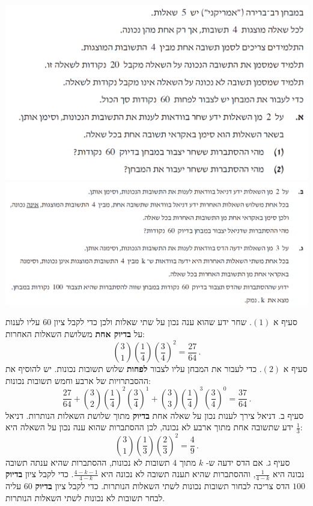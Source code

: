 \documentclass[12pt,a4paper]{article}
\begin{document}
\begin{center}
\includegraphics[width=.85\textwidth]{summer-2018b-3-1}
\includegraphics[width=\textwidth]{summer-2018b-3-2}
\end{center}

סעיף א
$(1)$.
שחר ידע שהוא ענה נכון על שתי שאלות ולכן כדי לקבל ציון
$60$
עליו לענות על 
\textbf{בדיוק אחת}
משלושת השאלות האחרות:
\[
{3 \choose 1}\left(\frac{1}{4}\right)\left(\frac{3}{4}\right)^2=\frac{27}{64}\,.
\]
סעיף א
$(2)$.
כדי לעבור את המבחן עליו לצבור
\textbf{לפחות}
שלוש תשובות נכונות. יש להוסיף את ההסבתרויות של ארבע וחמש תשובות נכונות:
\[
\frac{27}{64}+{3 \choose 2}\left(\frac{1}{4}\right)^2\left(\frac{3}{4}\right)^1+{3 \choose 3}\left(\frac{1}{4}\right)^3\left(\frac{3}{4}\right)^0=\frac{37}{64}\,.
\]
סעיף ב.
דניאל צירך לענות נכון על שאלה אחת 
\textbf{בדיוק}
מתוך שלושת השאלות הנותרות. דניאל ידע שתשובה אחת מתוך ארבע לא נכונה, לכן ההסתברות שהוא ענה נכון על השאלה היא
$\frac{1}{3}$:
\[
{3 \choose 1}\left(\frac{1}{3}\right)\left(\frac{2}{3}\right)^2=\frac{4}{9}\,.
\]
סעיף ג. אם הדס ידעה ש-%
$k$
מתוך 
$4$
תשובות לא נכונות, ההסתברות שהיא ענתה תשובה נכונה היא
$\frac{1}{4-k}$,
וההסתברות שהיא תענה תשובה לא נכונה היא
$\frac{4-k-1}{4-k}$.
כדי לקבל ציון 
\textbf{בדיוק}
$100$
הדס צריכה לבחור תשובות נכונות לשתי השאלות הנותרות. כדי לקבל ציון 
\textbf{בדיוק}
$60$
עליה לבחר תשובות לא נכונות לשתי השאלות הנותרות.
\end{document}
